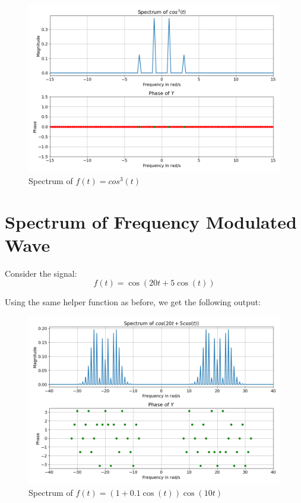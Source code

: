 \documentclass{article}
\begin{document}
\begin{figure}[!tbh]
\centering
\includegraphics[scale=0.4]{plots/cos3.png}
\caption{Spectrum of $f(t) = cos^3(t)$}
\label{fig:6}
\end{figure} 

\section*{Spectrum of Frequency Modulated Wave}
Consider the signal:\newline
\begin{equation}
f(t) =  \cos(20t +5 \cos(t))    
\end{equation}

Using the same helper function as before, we get the following output:\newline
\begin{figure}[!tbh]
\centering
\includegraphics[scale=0.4]{plots/freq_mod.png}
\caption{Spectrum of $f(t) = (1+0.1\cos(t))\cos(10t)$}
\label{fig:7}
\end{figure}
\end{document}
